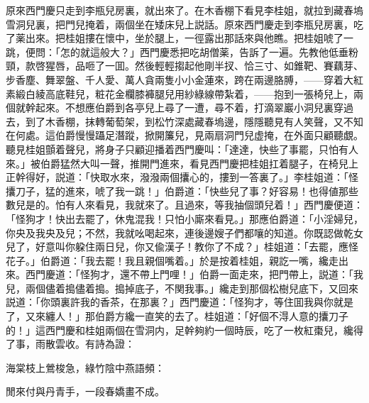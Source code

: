原來西門慶只走到李瓶兒房裏，就出來了。在木香棚下看見李桂姐，就拉到藏春塢雪洞兒裏，把門兒掩着，兩個坐在矮床兒上説話。原來西門慶走到李瓶兒房裏，吃了薬出來。把桂姐摟在懷中，坐於腿上，一徑露出那話來與他瞧。把桂姐唬了一跳，便問：「怎的就這般大？」西門慶悉把吃胡僧薬，告訴了一遍。先教他低垂粉頸，款啓猩唇，品咂了一囬。然後輕輕搊起他剛半扠、恰三寸、如錐靶、賽藕芽、步香塵、舞翠盤、千人愛、萬人貪兩隻小小金蓮來，跨在兩邊胳膊，——穿着大紅素緞白綾高底鞋兒，粧花金欄膝褲腿兒用紗綠線帶紮着，——抱到一張椅兒上，兩個就幹起來。不想應伯爵到各亭兒上尋了一遭，尋不着，打滴翠巖小洞兒裏穿過去，到了木香棚，抹轉葡萄架，到松竹深處藏春塢邊，隱隱聽見有人笑聲，又不知在何處。這伯爵慢慢躡足潛蹤，掀開簾兒，見兩扇洞門兒虚掩，在外面只顧聽覷。聽見桂姐顫着聲兒，將身子只顧迎播着西門慶叫：「達達，快些了事罷，只怕有人來。」被伯爵猛然大叫一聲，推開門進來，看見西門慶把桂姐扛着腿子，在椅兒上正幹得好，説道：「快取水來，潑潑兩個攮心的，摟到一答裏了。」李桂姐道：「怪攮刀子，猛的進來，唬了我一跳！」伯爵道：「快些兒了事？好容易！也得値那些數兒是的。怕有人來看見，我就來了。且過來，等我抽個頭兒着！」西門慶便道：「怪狗才！快出去罷了，休鬼混我！只怕小廝來看見。」那應伯爵道：「小淫婦兒，你央及我央及兒；不然，我就吆喝起來，連後邊嫂子們都嚷的知道。你既認做乾女兒了，好意叫你躱住兩日兒，你又偸漢子！教你了不成？」桂姐道：「去罷，應怪花子。」伯爵道：「我去罷！我且親個嘴着。」於是按着桂姐，親訖一嘴，纔走出來。西門慶道：「怪狗才，還不帶上門哩！」伯爵一面走來，把門帶上，説道：「我兒，兩個儘着搗儘着搗。搗掉底子，不関我事。」纔走到那個松樹兒底下，又回來説道：「你頭裏許我的香茶，在那裏？」西門慶道：「怪狗才，等住囬我與你就是了，又來纏人！」那伯爵方纔一直笑的去了。桂姐道：「好個不淂人意的攮刀子的！」這西門慶和桂姐兩個在雪洞内，足幹夠約一個時辰，吃了一枚紅棗兒，纔得了事，雨散雲收。有詩為證：

\begin{myquote}
海棠枝上鶯梭急，綠竹陰中燕語頻：　

閒來付與丹青手，一段春嬌畫不成。
\end{myquote}

